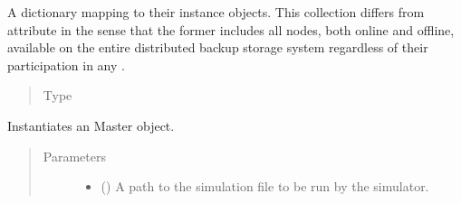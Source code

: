 \documentclass[letterpaper,10pt,english]{sphinxmanual}
\begin{document}
\begin{fulllineitems}
\begin{fulllineitems}
\label{\detokenize{app.domain:app.domain.master_servers.Master.network_nodes}}
A dictionary mapping {\hyperref[\detokenize{app.domain:app.domain.network_nodes.Node.id}]{}} to their instance objects.
This collection differs from
{\hyperref[\detokenize{app.domain:app.domain.cluster_groups.Cluster.members}]{}} attribute
in the sense that the former  includes all
nodes, both online and offline, available on the entire
distributed backup storage system regardless of their
participation in any {\hyperref[\detokenize{app.domain:app.domain.cluster_groups.Cluster}]{}}.
\begin{quote}\begin{description}
\item[{Type}] \leavevmode
{\hyperref[\detokenize{app:app.type_hints.NodeDict}]{}}

\end{description}\end{quote}

\end{fulllineitems}


\begin{fulllineitems}
\label{\detokenize{app.domain:app.domain.master_servers.Master.__init__}}
Instantiates an Master object.
\begin{quote}\begin{description}
\item[{Parameters}] \leavevmode\begin{itemize}
\item {} 
 () \textendash{} A path to the simulation file to be run by the simulator.


\end{itemize}
\end{description}
\end{quote}
\end{fulllineitems}
\end{fulllineitems}
\end{document}
